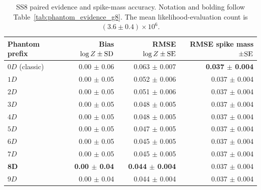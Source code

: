\documentclass[pdflatex,sn-basic,icol]{sn-jnl}
\theoremstyle{plain}
\theoremstyle{definition}
\begin{document}
\begin{table}[t]
\caption{SS8 paired evidence and spike-mass accuracy. Notation and bolding follow Table~\ref{tab:phantom_evidence_g8}. The mean likelihood-evaluation count is $(3.6\pm0.4)\times10^6$.}
\label{tab:phantom_evidence_ss8}
\centering
\scriptsize
\setlength{\tabcolsep}{3.0pt}
\renewcommand{\arraystretch}{0.92}
\begin{tabular}{lrrr}
\toprule
Phantom prefix & Bias $\log Z\mathbin{\pm}{\rm SD}$ & RMSE $\log Z\mathbin{\pm}{\rm SE}$ & RMSE spike mass $\mathbin{\pm}{\rm SE}$ \\
\midrule
$0D$ (classic) & 0.00 $\pm$ 0.06 & 0.063 $\pm$ 0.007 & \textbf{0.037 $\pm$ 0.004} \\
$1D$ & 0.00 $\pm$ 0.05 & 0.052 $\pm$ 0.006 & 0.037 $\pm$ 0.004 \\
$2D$ & 0.00 $\pm$ 0.05 & 0.051 $\pm$ 0.006 & 0.037 $\pm$ 0.004 \\
$3D$ & 0.00 $\pm$ 0.05 & 0.048 $\pm$ 0.005 & 0.037 $\pm$ 0.004 \\
$4D$ & 0.00 $\pm$ 0.05 & 0.048 $\pm$ 0.005 & 0.037 $\pm$ 0.004 \\
$5D$ & 0.00 $\pm$ 0.05 & 0.047 $\pm$ 0.005 & 0.037 $\pm$ 0.004 \\
$6D$ & 0.00 $\pm$ 0.05 & 0.045 $\pm$ 0.005 & 0.037 $\pm$ 0.004 \\
$7D$ & 0.00 $\pm$ 0.05 & 0.045 $\pm$ 0.005 & 0.037 $\pm$ 0.004 \\
$\boldsymbol{8D}$ & \textbf{0.00 $\pm$ 0.04} & \textbf{0.044 $\pm$ 0.004} & 0.037 $\pm$ 0.004 \\
$9D$ & 0.00 $\pm$ 0.04 & 0.044 $\pm$ 0.004 & 0.037 $\pm$ 0.004 \\
\bottomrule
\end{tabular}
\end{table}
\end{document}
